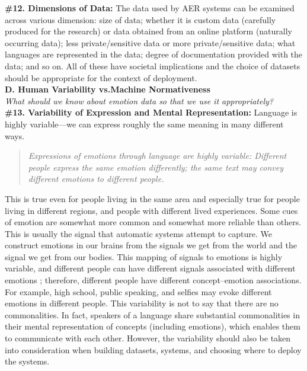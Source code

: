 \documentclass{clv3}
\begin{document}
\noindent \textbf{\#12. Dimensions of Data:} The data used by AER systems can be examined across various dimension: size of data; whether it is custom data (carefully produced for the research) or data obtained from an online platform (naturally occurring data); less private/sensitive data or more private/sensitive data; what languages are represented in the data; degree of documentation provided with the data; and so on. All of these have societal implications and the choice of datasets should be appropriate for the context of deployment.\\[3pt]

\noindent \textbf{D. Human Variability vs.\@ Machine Normativeness}\\[5pt]
\noindent \textit{What should we know about emotion data so that we use it appropriately?}\\

\noindent \textbf{\#13. Variability of Expression and Mental Representation:} Language is highly variable---we can express roughly the same meaning in many different ways.\\[-18pt]
\begin{quote}
\textit{Expressions of emotions through language are highly variable: Different people express the same emotion differently; the same text may convey different emotions to different people.
}
\end{quote}
\vspace*{-2mm}
\noindent This is true even for people living in the same area and especially true for people living in different regions, and people with different lived experiences.
Some cues of emotion are somewhat more common and somewhat more reliable than others. This is usually the signal that automatic systems attempt to capture.
We construct emotions in our brains from the signals we get from the world and the signal we get from our bodies. This mapping of signals to emotions is highly variable, and different people can have different signals associated with different emotions \cite{barrett2017theory}; therefore, different people have different concept--emotion associations. For example, high school, public speaking, and selfies may evoke different emotions in different people.
This variability is not to say that there are no commonalities. In fact, speakers of a language share substantial commonalities in their mental representation of concepts (including emotions), which enables them to communicate with each other. However,
the variability should also be taken into consideration when building datasets, systems, and choosing where to deploy the systems.\\
\end{document}
